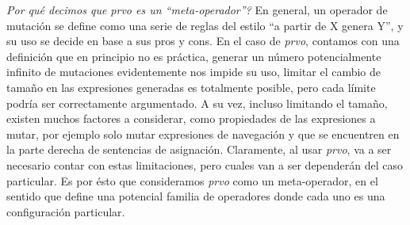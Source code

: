 \emph{Por qu\'e decimos que prvo es un ``meta-operador''?} En general, un operador de mutaci\'on se define como una serie de reglas del estilo ``a partir de X genera Y'', y su uso se decide en base a sus pros y cons. En el caso de \emph{prvo}, contamos con una definici\'on que en principio no es pr\'actica, generar un n\'umero potencialmente infinito de mutaciones evidentemente nos impide su uso, limitar el cambio de tama\~no en las expresiones generadas es totalmente posible, pero cada l\'imite podr\'ia ser correctamente argumentado. A su vez, incluso limitando el tama\~no, existen muchos factores a considerar, como propiedades de las expresiones a mutar, por ejemplo solo mutar expresiones de navegaci\'on y que se encuentren en la parte derecha de sentencias de asignaci\'on. Claramente, al usar \emph{prvo}, va a ser necesario contar con estas limitaciones, pero cuales van a ser depender\'an del caso particular. Es por \'esto que consideramos \emph{prvo} como un meta-operador, en el sentido que define una potencial familia de operadores donde cada uno es una configuraci\'on particular.


